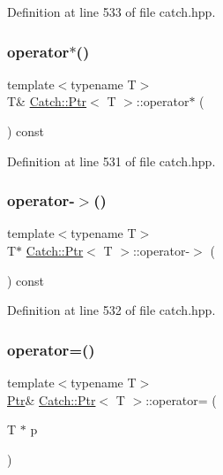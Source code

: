 Definition at line 533 of file catch.\+hpp.

\hypertarget{class_catch_1_1_ptr_a8d73989b1c77a1cab6152766feaa837f}{}\label{class_catch_1_1_ptr_a8d73989b1c77a1cab6152766feaa837f} 
\subsubsection{\texorpdfstring{operator$\ast$()}{operator*()}}
{\footnotesize\ttfamily template$<$typename T$>$ \\
T\& \hyperlink{class_catch_1_1_ptr}{Catch\+::\+Ptr}$<$ T $>$\+::operator$\ast$ (\begin{DoxyParamCaption}{ }\end{DoxyParamCaption}) const\hspace{0.3cm}{\ttfamily [inline]}}



Definition at line 531 of file catch.\+hpp.

\hypertarget{class_catch_1_1_ptr_acc0996cbd99f360069260a898b3f4fda}{}\label{class_catch_1_1_ptr_acc0996cbd99f360069260a898b3f4fda} 
\subsubsection{\texorpdfstring{operator-\/$>$()}{operator->()}}
{\footnotesize\ttfamily template$<$typename T$>$ \\
T$\ast$ \hyperlink{class_catch_1_1_ptr}{Catch\+::\+Ptr}$<$ T $>$\+::operator-\/$>$ (\begin{DoxyParamCaption}{ }\end{DoxyParamCaption}) const\hspace{0.3cm}{\ttfamily [inline]}}



Definition at line 532 of file catch.\+hpp.

\hypertarget{class_catch_1_1_ptr_a9b08c868b447d679ed201921f5c94683}{}\label{class_catch_1_1_ptr_a9b08c868b447d679ed201921f5c94683} 
\subsubsection{\texorpdfstring{operator=()}{operator=()}\hspace{0.1cm}{\footnotesize\ttfamily [1/2]}}
{\footnotesize\ttfamily template$<$typename T$>$ \\
\hyperlink{class_catch_1_1_ptr}{Ptr}\& \hyperlink{class_catch_1_1_ptr}{Catch\+::\+Ptr}$<$ T $>$\+::operator= (\begin{DoxyParamCaption}\item[{T $\ast$}]{p }\end{DoxyParamCaption})\hspace{0.3cm}{\ttfamily [inline]}}



